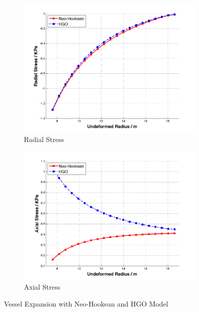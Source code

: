 \begin{figure}[t!p]
	\begin{subfigure}[b]{0.5\textwidth}
		\centering
		\includegraphics[width=\textwidth]{./figures/radial_nh_hgo.png}
		\caption{Radial Stress}
		\label{radial_nh_hgo}
	\end{subfigure}
	\begin{subfigure}[b]{0.5\textwidth}
		\centering
		\includegraphics[width=\textwidth]{./figures/axial_nh_hgo.png}
		\caption{Axial Stress}
		\label{axial_nh_hgo}
	\end{subfigure}
	\caption{Vessel Expansion with Neo-Hookean and HGO Model}
	\label{fig:nh_hgo}
\end{figure}
















